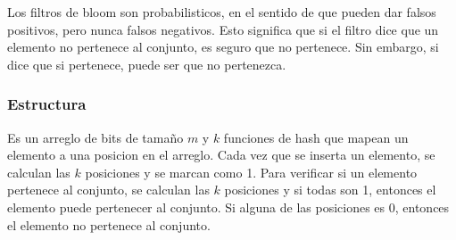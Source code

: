 Los filtros de bloom son probabilisticos, en el sentido de que pueden dar falsos positivos, pero nunca falsos negativos. Esto significa que si el filtro dice que un elemento no pertenece al conjunto, es seguro que no pertenece. Sin embargo, si dice que si pertenece, puede ser que no pertenezca.

\subsubsection{Estructura}
Es un arreglo de bits de tamaño $m$ y $k$ funciones de hash que mapean un elemento a una posicion en el arreglo. Cada vez que se inserta un elemento, se calculan las $k$ posiciones y se marcan como 1. Para verificar si un elemento pertenece al conjunto, se calculan las $k$ posiciones y si todas son 1, entonces el elemento puede pertenecer al conjunto. Si alguna de las posiciones es 0, entonces el elemento no pertenece al conjunto.

